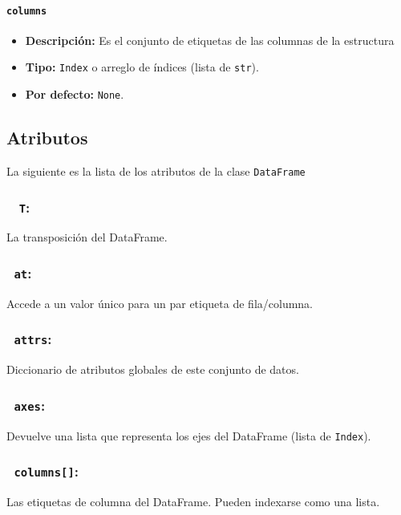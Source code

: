        \paragraph{\texttt{columns}}
        \begin{itemize}
            \item \textbf{Descripción:} Es el conjunto de etiquetas de las columnas de la estructura
            \item \textbf{Tipo:} \texttt{Index} o arreglo de índices (lista de \texttt{str}).
            \item \textbf{Por defecto:} \texttt{None}.
        \end{itemize}

        \subsection{Atributos}

        La siguiente es la lista de los atributos de la clase \texttt{DataFrame}

        \subsubsection{~\hspace{2em} \texttt{T}:} La transposición del DataFrame.

        \subsubsection{~\hspace{2em}\texttt{at}:} Accede a un valor único para un par etiqueta de fila/columna.

        \subsubsection{~\hspace{2em}\texttt{attrs}:} Diccionario de atributos globales de este conjunto de datos.

        \subsubsection{~\hspace{2em}\texttt{axes}:} Devuelve una lista que representa los ejes del DataFrame (lista de \texttt{Index}).

        \subsubsection{~\hspace{2em}\texttt{columns[]}:} Las etiquetas de columna del DataFrame. Pueden indexarse como una lista.

